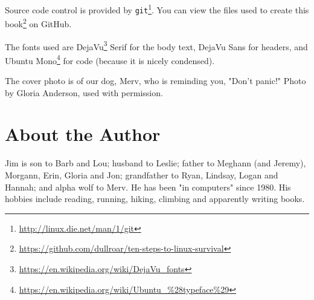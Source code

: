 \documentclass[10pt,american,]{book}
\makeatletter
\renewcommand{\href}[2]{#2\footnote{\url{#1}}}
\numberwithin{figure}{chapter}
\DeclareRobustCommand{\drcmd}[1]{\index{commands!#1@\texttt{#1}}}
\makeatother
\begin{document}
Source code control is provided by
\href{http://linux.die.net/man/1/git}{\texttt{git}}\drcmd{git}. You can
view \href{https://github.com/dullroar/ten-steps-to-linux-survival}{the
files used to create this book} on GitHub.

The fonts used are
\href{https://en.wikipedia.org/wiki/DejaVu_fonts}{DejaVu} Serif for the
body text, DejaVu Sans for headers, and
\href{https://en.wikipedia.org/wiki/Ubuntu_\%28typeface\%29}{Ubuntu
Mono} for code (because it is nicely condensed).

The cover photo is of our dog, Merv, who is reminding you, "Don't
panic!" Photo by Gloria Anderson, used with permission.

\section*{About the Author}\label{about-the-author}

Jim is son to Barb and Lou; husband to Leslie; father to Meghann (and
Jeremy), Morgann, Erin, Gloria and Jon; grandfather to Ryan, Lindsay,
Logan and Hannah; and alpha wolf to Merv. He has been "in computers"
since 1980. His hobbies include reading, running, hiking, climbing and
apparently writing books.

\cleardoublepage
{}
\printindex
\end{document}
